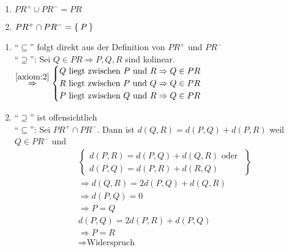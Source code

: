 \begin{korollar}
    \begin{enumerate}[label=(\roman*)]
        \item $PR^+ \cup PR^- = PR$
        \item $PR^+ \cap PR^- = \Set{P}$
    \end{enumerate}
\end{korollar}

\begin{beweis}\leavevmode
    \begin{enumerate}[label=(\roman*)]
        \item \enquote{$\subseteq$} folgt direkt aus der Definition von $PR^+$ und $PR^-$\\
              \enquote{$\supseteq$}: Sei $Q \in PR \Rightarrow P, Q, R$ 
              sind kolinear.\\
              $\stackrel{\ref{axiom:2}}{\Rightarrow}
              \begin{cases} 
                Q \text{ liegt zwischen } P \text{ und } R \Rightarrow Q \in PR\\
                R \text{ liegt zwischen } P \text{ und } Q \Rightarrow Q \in PR\\
                P \text{ liegt zwischen } Q \text{ und } R \Rightarrow Q \in PR
              \end{cases}$
        \item \enquote{$\supseteq$} ist offensichtlich\\
              \enquote{$\subseteq$}: Sei $PR^+ \cap PR^-$. Dann ist
              $d(Q,R) = d(P,Q) + d(P,R)$ weil $Q \in PR^-$ und
              \begin{align*}
                &\left \{ \begin{array}{l}
                        d(P,R) = d(P,Q) + d(Q,R) \text{ oder }\\
                        d(P,Q) = d(P,R) + d(R,Q)
                       \end{array} \right \}\\
                &\Rightarrow d(Q,R) = 2d(P,Q) + d(Q,R)\\
                &\Rightarrow d(P,Q) = 0\\
                &\Rightarrow P=Q\\
                &d(P,Q) = 2d(P,R) + d(P,Q)\\
                &\Rightarrow P=R\\
                &\Rightarrow \text{Widerspruch}
              \end{align*}
    \end{enumerate}
\end{beweis}

